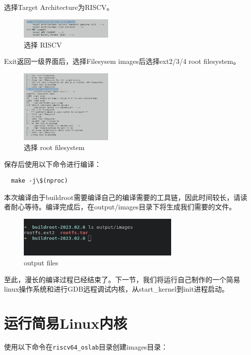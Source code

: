 \documentclass[lang=cn,10pt]{elegantbook}
\begin{document}
\newpage

选择Target Architecture为RISCV。
\begin{figure}[htbp]
  \centering
  \includegraphics[width=0.4\textwidth]{image/image-20231105101313146.png}
  \caption{选择 RISCV}
\end{figure}

Exit返回一级界面后，选择Filesysem images后选择ext2/3/4 root filesystem。
\begin{figure}[htbp]
  \centering
  \includegraphics[width=0.4\textwidth]{image/image-20231105101339834.png}
  \caption{选择  root filesystem}
\end{figure}

保存后使用以下命令进行编译：

\begin{lstlisting}
  make -j\$(nproc)	
\end{lstlisting}

本次编译由于buildroot需要编译自己的编译需要的工具链，因此时间较长，请读者耐心等待。编译完成后，在output/images目录下将生成我们需要的文件。

\begin{figure}[htbp]
  \centering
  \includegraphics[width=0.7\textwidth]{image/image-20231105101948270.png}
  \caption{output files}
\end{figure}

至此，漫长的编译过程已经结束了。下一节，我们将运行自己制作的一个简易linux操作系统和进行GDB远程调试内核，从start\_kernel到init进程启动。

\section{运行简易Linux内核}
使用以下命令在\lstinline{riscv64_oslab}目录创建images目录：
\end{document}
